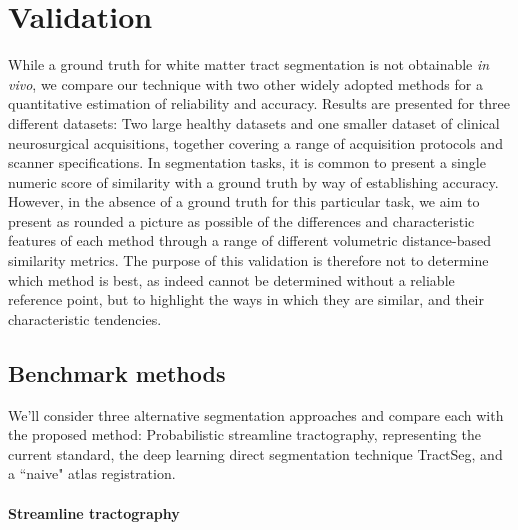\section{Validation}



While a ground truth for white matter tract segmentation is not obtainable \textit{in vivo}, we compare our technique with two other widely adopted methods for a quantitative estimation of reliability and accuracy.
Results are presented for three different datasets: Two large healthy datasets and one smaller dataset of clinical neurosurgical acquisitions, together covering a range of acquisition protocols and scanner specifications.
In segmentation tasks, it is common to present a single numeric score of similarity with a ground truth by way of establishing accuracy.
However, in the absence of a ground truth for this particular task, we aim to present as rounded a picture as possible of the differences and characteristic features of each method through a range of different volumetric distance-based similarity metrics.
The purpose of this validation is therefore not to determine which method is best, as indeed cannot be determined without a reliable reference point, but to highlight the ways in which they are similar, and their characteristic tendencies.

\subsection{Benchmark methods}

We'll consider three alternative segmentation approaches and compare each with the proposed method: Probabilistic streamline tractography, representing the current standard, the deep learning direct segmentation technique TractSeg, and a ``naive" atlas registration.

\paragraph*{Streamline tractography}

